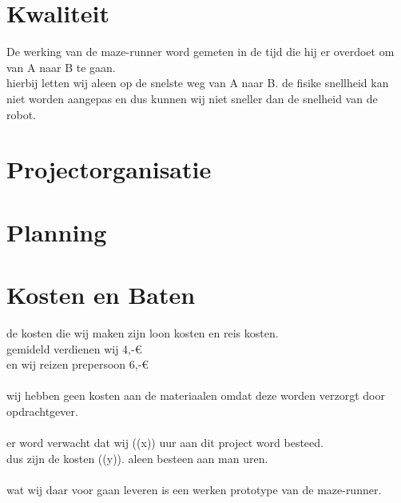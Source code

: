 \documentclass[oneside]{book}
\begin{document}
\chapter{Kwaliteit}
	De werking van de maze-runner word gemeten in de tijd die hij er overdoet om van A naar B te gaan.\\
	hierbij letten wij aleen op de snelste weg van A naar B. de fisike snellheid kan niet worden aangepas en dus kunnen wij niet sneller dan de snelheid van de robot.
\clearpage
\chapter{Projectorganisatie}
\clearpage
\chapter{Planning}
\clearpage
\chapter{Kosten en Baten}
de kosten die wij maken zijn loon kosten en reis kosten.\\
gemideld verdienen wij 4,-\euro{} \\
en wij reizen prepersoon 6,-\euro{} \\ 
\\
wij hebben geen kosten aan de materiaalen omdat deze worden verzorgt door opdrachtgever.\\
\\
er word verwacht dat wij ((x)) uur aan dit project word besteed.\\
dus zijn de kosten ((y)). aleen besteen aan man uren.\\
\\
wat wij daar voor gaan leveren is een werken prototype van de maze-runner.
\clearpage
\end{document}
